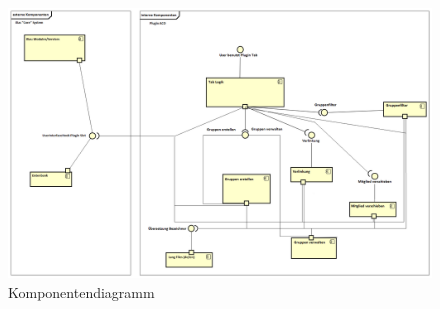 \newpage



\begin{figure}
	\centering
	\includegraphics[width=1\textwidth]{img/ComponentDiagram.png}
	\caption{Komponentendiagramm}
\end{figure}


\clearpage



\newpage

\newpage

\newpage

\newpage

\newpage

\newpage

\newpage

\newpage
